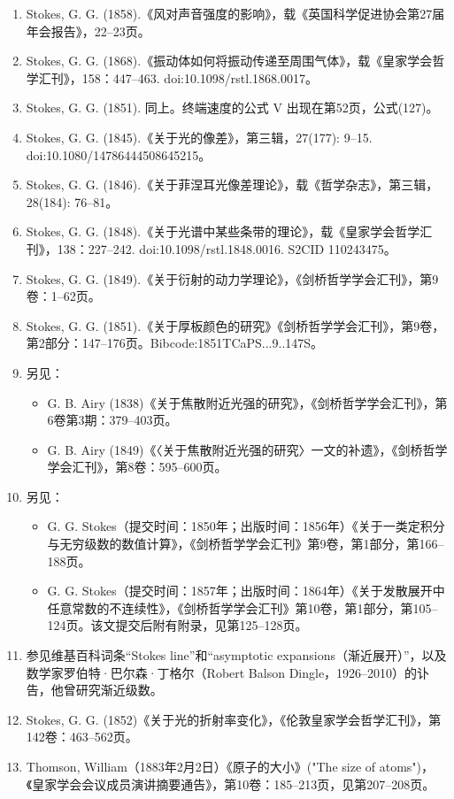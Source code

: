 \begin{enumerate}
\item Stokes, G. G. (1858).《风对声音强度的影响》，载《英国科学促进协会第27届年会报告》，22–23页。
\item Stokes, G. G. (1868).《振动体如何将振动传递至周围气体》，载《皇家学会哲学汇刊》，158：447–463. doi:10.1098/rstl.1868.0017。
\item Stokes, G. G. (1851). 同上。终端速度的公式 V 出现在第52页，公式(127)。
\item Stokes, G. G. (1845).《关于光的像差》，第三辑，27(177): 9–15. doi:10.1080/14786444508645215。
\item Stokes, G. G. (1846).《关于菲涅耳光像差理论》，载《哲学杂志》，第三辑，28(184): 76–81。
\item Stokes, G. G. (1848).《关于光谱中某些条带的理论》，载《皇家学会哲学汇刊》，138：227–242. doi:10.1098/rstl.1848.0016. S2CID 110243475。
\item Stokes, G. G. (1849).《关于衍射的动力学理论》，《剑桥哲学学会汇刊》，第9卷：1–62页。
\item Stokes, G. G. (1851).《关于厚板颜色的研究》《剑桥哲学学会汇刊》，第9卷，第2部分：147–176页。Bibcode:1851TCaPS...9..147S。
\item 另见：
\begin{itemize}
\item G. B. Airy (1838)《关于焦散附近光强的研究》，《剑桥哲学学会汇刊》，第6卷第3期：379–403页。
\item G. B. Airy (1849)《〈关于焦散附近光强的研究〉一文的补遗》，《剑桥哲学学会汇刊》，第8卷：595–600页。
\end{itemize}
\item 另见：
\begin{itemize}
\item G. G. Stokes（提交时间：1850年；出版时间：1856年）《关于一类定积分与无穷级数的数值计算》，《剑桥哲学学会汇刊》第9卷，第1部分，第166–188页。
\item G. G. Stokes（提交时间：1857年；出版时间：1864年）《关于发散展开中任意常数的不连续性》，《剑桥哲学学会汇刊》第10卷，第1部分，第105–124页。该文提交后附有附录，见第125–128页。
\end{itemize}
\item 参见维基百科词条“Stokes line”和“asymptotic expansions（渐近展开）”，以及数学家罗伯特·巴尔森·丁格尔（Robert Balson Dingle，1926–2010）的讣告，他曾研究渐近级数。
\item Stokes, G. G. (1852)《关于光的折射率变化》，《伦敦皇家学会哲学汇刊》，第142卷：463–562页。
\item Thomson, William（1883年2月2日）《原子的大小》("The size of atoms")，《皇家学会会议成员演讲摘要通告》，第10卷：185–213页，见第207–208页。

\end{enumerate}
